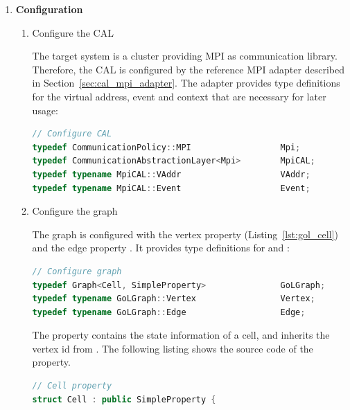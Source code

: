 \begin{enumerate}

\item \textbf{Configuration}
\begin{enumerate}

\item Configure the CAL
  
  The target system is a cluster providing MPI as communication
  library. Therefore, the CAL is configured by the reference MPI adapter
  described in Section~\ref{sec:cal_mpi_adapter}. The adapter provides
  type definitions for the virtual address, event and context that are
  necessary for later usage:

  \begin{minipage}[t]{\textwidth} 
  \begin{lstlisting}[language=C++, label=lst:conf_cal, caption={\ }]
// Configure CAL
typedef CommunicationPolicy::MPI                  Mpi;
typedef CommunicationAbstractionLayer<Mpi>        MpiCAL;
typedef typename MpiCAL::VAddr                    VAddr;
typedef typename MpiCAL::Event                    Event;
  \end{lstlisting}
  \end{minipage}

\item Configure the graph

  The graph is configured with the vertex property  
  (Listing~\ref{lst:gol_cell}) and the edge property . It
  provides type definitions for  and  :

  \begin{minipage}[t]{\textwidth} 
  \begin{lstlisting}[language=C++, label=lst:conf_graph, caption={\ }]
// Configure graph
typedef Graph<Cell, SimpleProperty>               GoLGraph;
typedef typename GoLGraph::Vertex                 Vertex;
typedef typename GoLGraph::Edge                   Edge;
  \end{lstlisting}
  \end{minipage}

  The  property contains the state information of a cell,
  and inherits the vertex id from .  The following
  listing shows the source code of the  property.

  \begin{minipage}[t]{\textwidth} 
  \begin{lstlisting}[language=C++, label=lst:gol_cell, caption={\ }]
// Cell property    
struct Cell : public SimpleProperty { 


\end{lstlisting}
\end{minipage}
\end{enumerate}
\end{enumerate}

